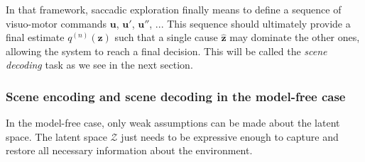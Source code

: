 \documentclass[12pt,twoside,openright]{article}
\begin{document}









 

In that framework, 
saccadic exploration finally means to define a sequence of visuo-motor commands $\boldsymbol{u}$, $\boldsymbol{u}'$, $\boldsymbol{u}''$, ... This sequence should ultimately provide a final estimate $q^{(n)}(\boldsymbol{z})$ such that a single cause $\hat{\boldsymbol{z}}$ may dominate the other ones, allowing the system to reach a final decision. This will be called the \emph{scene decoding} task as we see in the next section.











\subsubsection{Scene encoding and scene decoding in the model-free case}

In the model-free case, only weak assumptions can be made about the latent space.  The latent space $\mathcal{Z}$ just needs to be expressive enough to capture and restore all necessary information about the environment.  
\end{document}
